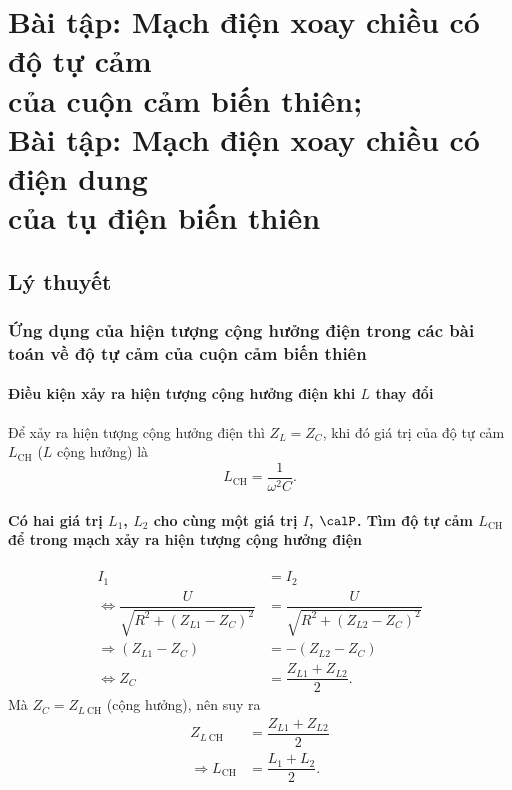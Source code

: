 
\chapter[Bài tập: Mạch điện xoay chiều có\\ độ tự cảm của cuộn cảm biến thiên;\\Bài tập: Mạch điện xoay chiều có\\ điện dung của tụ điện biến thiên]{Bài tập: Mạch điện xoay chiều có độ tự cảm\\ của cuộn cảm biến thiên;\\Bài tập: Mạch điện xoay chiều có điện dung\\ của tụ điện biến thiên}
\section{Lý thuyết}
\subsection{Ứng dụng của hiện tượng cộng hưởng điện trong các bài toán về độ tự cảm của cuộn cảm biến thiên}
\subsubsection{Điều kiện xảy ra hiện tượng cộng hưởng điện khi $L$ thay đổi}
Để xảy ra hiện tượng cộng hưởng điện thì $Z_L = Z_C$, khi đó giá trị của độ tự cảm $L_\text{CH}$ ($L$ cộng hưởng) là
\begin{equation*}
	L_\text{CH}=\dfrac{1}{\omega ^2 C}.
\end{equation*}
\subsubsection{Có hai giá trị $L_1$, $L_2$ cho cùng một giá trị $I$, $\calP$. Tìm độ tự cảm $L_\text{CH}$ để trong mạch xảy ra hiện tượng cộng hưởng điện}
\begin{align*}
	I_1 &= I_2 \\
	\Leftrightarrow \dfrac{U}{\sqrt{R^2 + (Z_{L1}-Z_C)^2}}&=\dfrac{U}{\sqrt{R^2+(Z_{L2}-Z_C)^2}}\\
	\Rightarrow (Z_{L1}-Z_C)&=-(Z_{L2}-Z_C)\\
	\Leftrightarrow Z_C &= \dfrac{Z_{L1}+Z_{L2}}{2}.	
\end{align*}
Mà $Z_C = Z_{L\ \text{CH}}$ (cộng hưởng), nên suy ra
\begin{align*}
	Z_{L\ \text{CH}}&= \dfrac{Z_{L1}+Z_{L2}}{2} \\
	\Rightarrow {L_\text{CH}}&= \dfrac{L_1+L_2}{2}.
\end{align*}

